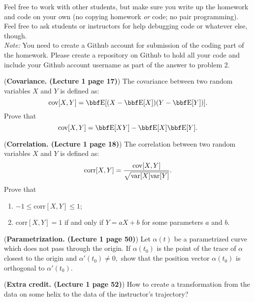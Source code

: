 \documentclass[12pt,letterpaper]{hmcpset}
\begin{document}
Feel free to work with other students, but make sure you write up the homework
and code on your own (no copying homework \textit{or} code; no pair programming).
Feel free to ask students or instructors for help debugging code or whatever else,
though.\\

\textit{Note:} You need to create a Github account for submission of the coding part of the homework. Please create a repository on Github to hold all your code and include your Github account username as part of the answer to problem 2.

\begin{problem}[1]
(\textbf{Covariance. (Lecture 1 page 17)}) The covariance between two random variables $X$ and $Y$ is defined as:
$$
   \cov[X,Y] = \EE[(X-\EE[X])(Y-\EE[Y])].
$$
Prove that 
$$
\cov[X,Y] = \EE[XY]- \EE[X] \EE[Y].
$$
\end{problem}
\begin{solution}
    \vfill
\end{solution}
\newpage




\begin{problem}[2]
(\textbf{Correlation. (Lecture 1 page 18)}) The correlation between two random variables $X$ and $Y$ is defined as:
$$
\text{corr}[X,Y] =\frac{ {\hbox{cov}}[X,Y]}{\sqrt{{\hbox{var}}[X]{\hbox{var}}[Y]}}.
$$
Prove that 
\begin{enumerate}
\item $-1\le\text{corr}[X,Y]\le1$;
\item $\text{corr}[X,Y]=1$ if and only if $Y=aX+b$ for some parameters $a$ and $b$.
\end{enumerate}


\end{problem}
\begin{solution}
    \vfill
\end{solution}
\newpage

\begin{problem}[3]
	(\textbf{Parametrization. (Lecture 1 page 50)}) Let $\alpha(t)$ be a parametrized curve which does not pass through the origin. If $\alpha(t_0)$ is the point of the trace of $\alpha$ closest to the origin and $\alpha'(t_0)\neq0,$ show that the position vector $\alpha(t_0)$ is orthogonal to $\alpha'(t_0)$.
	
	
\end{problem}
\begin{solution}
	\vfill
\end{solution}
\newpage



\begin{problem}[4]
	(\textbf{Extra credit. (Lecture 1 page 52)}) How to create a transformation from the data on some helix to the data of the instructor’s trajectory?
	
	
\end{problem}
\begin{solution}
	\vfill
\end{solution}
\newpage
\end{document}
